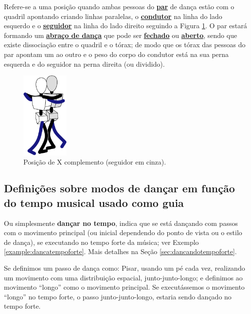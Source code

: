 \begin{definition}
\label{def:X-complemento-position} 
Refere-se a uma posição quando ambas pessoas do \hyperref[def:Par]{\textbf{par}} 
de dança estão com o quadril apontando criando linhas paralelas,
o \hyperref[def:Condutor]{\textbf{condutor}} na linha do lado esquerdo e
o \hyperref[def:Seguidor]{\textbf{seguidor}} na linha do lado direito seguindo a Figura \ref{fig:positiongeralsamba:xcomplemento}.
O par estará formando um \hyperref[def:abracodedanca]{\textbf{abraço de dança}}
que pode ser \hyperref[def:closed-position]{\textbf{fechado}} 
ou \hyperref[def:open-position]{\textbf{aberto}},
sendo que existe dissociação entre o quadril e o tórax;
de modo que os tórax das pessoas do par apontam um ao outro e 
o peso do corpo do condutor está na sua perna esquerda e do seguidor na perna direita (ou dividido).
\end{definition}

\begin{figure}[!ht]
         \centering
         \includegraphics[width=0.21\textwidth]{chapters/cap-normas/position-x-complemento.eps}
         \caption{Posição de X complemento (seguidor em cinza).}
         \label{fig:positiongeralsamba:xcomplemento}
\end{figure}

\subsection{Definições sobre modos de dançar em função do tempo musical usado como guia}



\begin{definition} 
\label{def:DancaNoTempo}
Ou simplesmente \textbf{dançar no tempo}, indica que se está dançando com passos com o movimento principal 
(ou inicial dependendo do ponto de vista ou o estilo de dança), 
se executando no tempo forte da música; ver Exemplo \ref{example:dancatempoforte}.
Mais detalhes na Seção \ref{sec:dancandotempoforte}.
\end{definition}
\begin{example}
\label{example:dancatempoforte}
Se definimos um passo de dança como: Pisar, usando um pé cada vez, 
realizando um movimento com uma distribuição espacial, junto-junto-longo;
e definimos ao movimento ``longo'' como o movimento principal. 
Se executássemos o movimento ``longo'' no tempo forte, o passo junto-junto-longo,
estaria sendo dançado no tempo forte.
\end{example}

